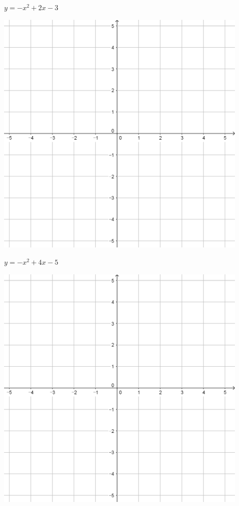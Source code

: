 \documentclass{oblivoir}
\begin{document}
\clearpage
\begin{minipage}{0.45\textwidth}\centering
\(y=-x^2+2x-3\)
\par\bigskip\includegraphics[width=0.9\textwidth]{55}
\end{minipage}
\begin{minipage}{0.45\textwidth}\centering
\(y=-x^2+4x-5\)
\par\bigskip\includegraphics[width=0.9\textwidth]{55}
\end{minipage}\bigskip\bigskip\par
\end{document}
